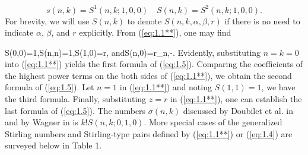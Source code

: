 \[
s(n,k)=S^1(n,k; 1,0,0)\quad S(n,k)=S^2(n,k; 1,0,0).
\]
For brevity, we will use $S(n,k)$ to denote $S(n,k,\alpha, \beta,r)$ if there is no need to indicate $\alpha$, $\beta$, and $r$ explicitly. From (\ref{eq:1.1**}), one may find

\be\label{eq:1.5}
S(0,0)=1,\quad S(n,n)=1,\quad S(1,0)=r, \quad and\quad S(n,0)=\la r\ra _{n,-\alpha}.
\ee
Evidently, substituting $n=k=0$ into
(\ref{eq:1.1**}) yields the first formula of (\ref{eq:1.5}). Comparing the coefficients of the highest power terms on the both sides of (\ref{eq:1.1**}), we obtain the second formula of (\ref{eq:1.5}).  Let $n=1$ in (\ref{eq:1.1**}) and noting $S(1,1)=1$, we have the third formula. Finally, substituting $z=r$ in (\ref{eq:1.1**}), one can establish the last formula of (\ref{eq:1.5}). The numbers $\sigma (n,k)$ discussed by Doubilet et al. in \cite{DRS} and by Wagner in \cite{Wag} is $k! S(n,k;0,1,0)$. More special cases of the generalized Stirling numbers and Stirling-type pairs defined by (\ref{eq:1.1**}) or (\ref{eq:1.4}) are surveyed below in Table 1.


